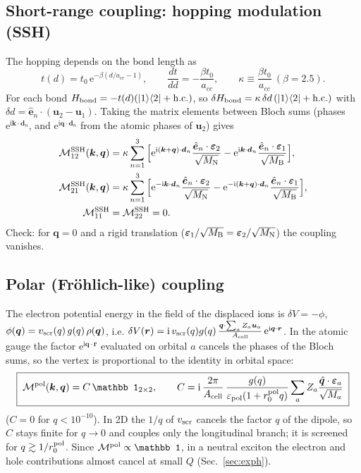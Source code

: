 \documentclass[11pt,a4paper]{article}
\newcommand{\ii}{\mathrm{i}}
\newcommand{\ee}{\mathrm{e}}
\newcommand{\kk}{\bm{k}}
\newcommand{\qq}{\bm{q}}
\newcommand{\dd}{\bm{d}}
\newcommand{\hatq}{\hat{\bm{q}}}
\newcommand{\hate}{\hat{\bm{e}}}
\newcommand{\ket}[1]{\left|#1\right\rangle}
\newcommand{\bra}[1]{\left\langle#1\right|}
\newcommand{\Acell}{A_{\rm cell}}
\begin{document}
\subsection{Short-range coupling: hopping modulation (SSH)}
The hopping depends on the bond length as
\begin{equation}
t(d)=t_0\,\ee^{-\beta(d/a_{cc}-1)},\qquad \frac{dt}{dd}=-\frac{\beta t_0}{a_{cc}},\qquad \kappa\equiv\frac{\beta t_0}{a_{cc}}\ (\beta=2.5).
\end{equation}
For each bond $H_{\rm bond}=-t(d)(\ket{1}\!\bra{2}+{\rm h.c.})$, so $\delta H_{\rm bond}=\kappa\,\delta d\,(\ket{1}\!\bra{2}+{\rm h.c.})$ with $\delta d=\hate_n\cdot(\bm u_2-\bm u_1)$. Taking the matrix elements between Bloch sums (phases $\ee^{\ii\kk\cdot\dd_n}$, and $\ee^{\ii\qq\cdot\dd_n}$ from the atomic phases of $\bm u_2$) gives
\begin{align}
\mathcal M^{\rm SSH}_{12}(\kk,\qq)&=\kappa\sum_{n=1}^3\Big[\ee^{\ii(\kk+\qq)\cdot\dd_n}\frac{\hate_n\cdot\bm\varepsilon_2}{\sqrt{M_{\rm N}}}-\ee^{\ii\kk\cdot\dd_n}\frac{\hate_n\cdot\bm\varepsilon_1}{\sqrt{M_{\rm B}}}\Big],\nonumber\\
\mathcal M^{\rm SSH}_{21}(\kk,\qq)&=\kappa\sum_{n=1}^3\Big[\ee^{-\ii\kk\cdot\dd_n}\frac{\hate_n\cdot\bm\varepsilon_2}{\sqrt{M_{\rm N}}}-\ee^{-\ii(\kk+\qq)\cdot\dd_n}\frac{\hate_n\cdot\bm\varepsilon_1}{\sqrt{M_{\rm B}}}\Big],\nonumber\\
\mathcal M^{\rm SSH}_{11}&=\mathcal M^{\rm SSH}_{22}=0.
\label{eq:SSH}
\end{align}
Check: for $\qq=0$ and a rigid translation ($\bm\varepsilon_1/\sqrt{M_{\rm B}}=\bm\varepsilon_2/\sqrt{M_{\rm N}}$) the coupling vanishes.

\subsection{Polar (Fr\"ohlich-like) coupling}
The electron potential energy in the field of the displaced ions is $\delta V=-\phi$, $\phi(\qq)=v_{\rm scr}(q)\,g(q)\,\rho(\qq)$, i.e.
$\delta V(\bm r)=\ii\,v_{\rm scr}(q)g(q)\,\frac{\qq\cdot\sum_aZ_a\bm u_a}{\Acell}\,\ee^{\ii\qq\cdot\bm r}$.
In the atomic gauge the factor $\ee^{\ii\qq\cdot\bm r}$ evaluated on orbital $a$ cancels the phases of the Bloch sums, so the vertex is proportional to the identity in orbital space:
\begin{equation}
\boxed{\;\mathcal M^{\rm pol}(\kk,\qq)=C\,\mathbb 1_{2\times2},\qquad
C=\ii\,\frac{2\pi}{\Acell}\,\frac{g(q)}{\varepsilon_{\rm pol}(1+r_0^{\rm pol}q)}\sum_{a}Z_a\frac{\hatq\cdot\bm\varepsilon_a}{\sqrt{M_a}}\;}
\label{eq:pol}
\end{equation}
($C=0$ for $q<10^{-10}$). In 2D the $1/q$ of $v_{\rm scr}$ cancels the factor $q$ of the dipole, so $C$ stays finite for $q\to0$ and couples only the longitudinal branch; it is screened for $q\gtrsim1/r_0^{\rm pol}$. Since $\mathcal M^{\rm pol}\propto\mathbb 1$, in a neutral exciton the electron and hole contributions almost cancel at small $Q$ (Sec.~\ref{sec:exph}).
\end{document}
